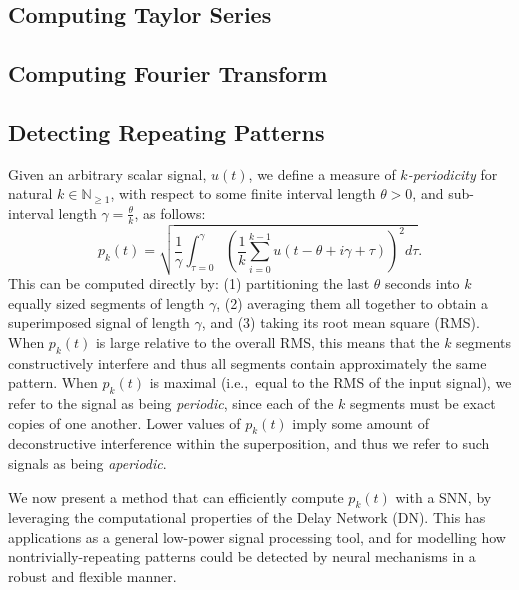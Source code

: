 \subsection{Computing Taylor Series}
\label{sec:taylor-series}


\subsection{Computing Fourier Transform}
\label{sec:fourier-transform}


\subsection{Detecting Repeating Patterns}
\label{sec:periodicity}

Given an arbitrary scalar signal, $u(t)$, we define a measure of \emph{$k$-periodicity} for natural $k \in \mathbb{N}_{\ge 1}$, with respect to some finite interval length $\theta > 0$, and sub-interval length $\gamma = \frac{\theta}{k}$, as follows:
\begin{equation} \label{eq:periodicity}
p_k(t) = \sqrt{ \frac{1}{\gamma} \int_{\tau=0}^{\gamma} \left( \frac{1}{k} \sum_{i=0}^{k-1} u \left( t - \theta + i \gamma + \tau \right) \right)^2 d\tau } \text{.}
\end{equation}
This can be computed directly by: (1) partitioning the last $\theta$ seconds into $k$ equally sized segments of length $\gamma$, (2) averaging them all together to obtain a superimposed signal of length $\gamma$, and (3) taking its root mean square (RMS).
When $p_k(t)$ is large relative to the overall RMS, this means that the $k$ segments constructively interfere and thus all segments contain approximately the same pattern. 
When $p_k(t)$ is maximal (i.e.,~equal to the RMS of the input signal), we refer to the signal  as being \emph{periodic}, since each of the $k$ segments must be exact copies of one another.
Lower values of $p_k(t)$ imply some amount of deconstructive interference within the superposition, and thus we refer to such signals as being \emph{aperiodic}.

We now present a method that can efficiently compute $p_k(t)$ with a SNN, by leveraging the computational properties of the Delay Network (DN).
This has applications as a general low-power signal processing tool, and for modelling how nontrivially-repeating patterns could be detected by neural mechanisms in a robust and flexible manner.

